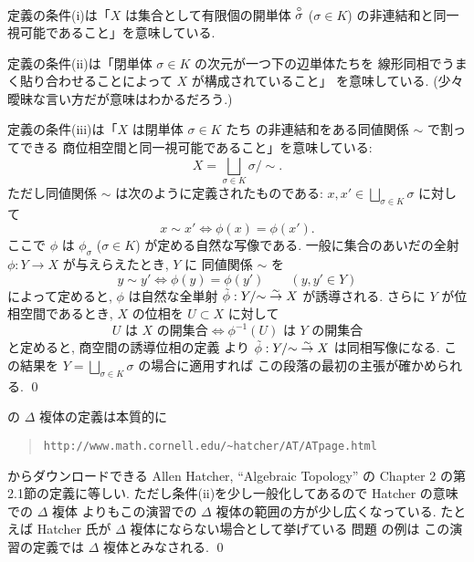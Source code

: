 \documentclass[12pt,twoside]{jarticle}
\begin{document}
\begin{rem}[上の定義の解説]
 定義の条件(i)は「$X$ は集合として有限個の開単体 ${\overset{\circ}{\sigma}}$ 
 ($\sigma\in K$) の非連結和と同一視可能であること」を意味している.

 定義の条件(ii)は「閉単体 $\sigma\in K$ の次元が一つ下の辺単体たちを
 線形同相でうまく貼り合わせることによって $X$ が構成されていること」
 を意味している. (少々曖昧な言い方だが意味はわかるだろう.)

 定義の条件(iii)は「$X$ は閉単体 $\sigma\in K$ たち
 の非連結和をある同値関係 $\sim$ で割ってできる
 商位相空間と同一視可能であること」を意味している:
 \begin{equation*}
  X = \bigsqcup_{\sigma\in K}\sigma\Big/{\sim}.
 \end{equation*}
 ただし同値関係 $\sim$ は次のように定義されたものである:
 $x,x'\in \bigsqcup_{\sigma\in K}\sigma$ に対して
 \begin{equation*}
  x\sim x' \iff \phi(x) = \phi(x').
 \end{equation*}
 ここで $\phi$ は $\phi_{\sigma}$ ($\sigma\in K$) が定める自然な写像である.
 一般に集合のあいだの全射 $\phi:Y\to X$ が与えらえたとき, $Y$ に
 同値関係 $\sim$ を
 \begin{equation*}
  y\sim y' \iff \phi(y) = \phi(y')  \qquad (y,y'\in Y)
 \end{equation*}
 によって定めると, $\phi$ は自然な全単射 $\tilde{\phi}:Y/{\sim}\overset\sim\rightarrow X$ 
 が誘導される. さらに $Y$ が位相空間であるとき, $X$ の位相を $U\subset X$ 
 に対して
 \begin{equation*}
  \text{$U$ は $X$ の開集合} \iff \text{$\phi^{-1}(U)$ は $Y$ の開集合}
 \end{equation*}
 と定めると, 商空間の誘導位相の定義
 より $\tilde{\phi}:Y/{\sim}\overset\sim\rightarrow X$ は同相写像になる.
 この結果を $Y=\bigsqcup_{\sigma\in K}\sigma$ の場合に適用すれば
 この段落の最初の主張が確かめられる.
 \qed
\end{rem}

\begin{rem}
 の $\Delta$ 複体の定義は本質的に
 \begin{quote}
 \verb,http://www.math.cornell.edu/~hatcher/AT/ATpage.html,
 \end{quote}
 からダウンロードできる Allen Hatcher, ``Algebraic Topology''
 の Chapter 2 の第2.1節の定義に等しい.  
 ただし条件(ii)を少し一般化してあるので Hatcher の意味での $\Delta$ 複体
 よりもこの演習での $\Delta$ 複体の範囲の方が少し広くなっている.  
 たとえば Hatcher 氏が $\Delta$ 複体にならない場合として挙げている
 問題  の例は
 この演習の定義では $\Delta$ 複体とみなされる.
 \qed
\end{rem}
\end{document}
